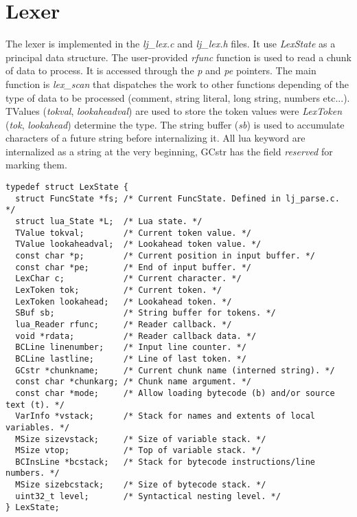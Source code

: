 
\section{Lexer}
\label{Sec:Lexer}

The lexer is implemented in the \emph{lj\_lex.c} and \emph{lj\_lex.h} files.
It use \emph{LexState} as a principal data structure. The user-provided
\emph{rfunc} function is used to read a chunk of data to process. It is accessed
through the \emph{p} and \emph{pe} pointers. The main function is
\emph{lex\_scan} that dispatches the work to other functions depending of the
type of data to be processed (comment, string literal, long string, numbers
etc...). TValues (\emph{tokval}, \emph{lookaheadval}) are used to store the
token values were \emph{LexToken} (\emph{tok}, \emph{lookahead}) determine the
type. The string buffer (\emph{sb}) is used to accumulate characters of a future
string before internalizing it. All lua keyword are internalized as a string at
the very beginning, GCstr has the field \emph{reserved} for marking them.

\begin{lstlisting}[style=CStyle]
typedef struct LexState {
  struct FuncState *fs; /* Current FuncState. Defined in lj_parse.c. */
  struct lua_State *L;  /* Lua state. */
  TValue tokval;        /* Current token value. */
  TValue lookaheadval;  /* Lookahead token value. */
  const char *p;        /* Current position in input buffer. */
  const char *pe;       /* End of input buffer. */
  LexChar c;            /* Current character. */
  LexToken tok;         /* Current token. */
  LexToken lookahead;   /* Lookahead token. */
  SBuf sb;              /* String buffer for tokens. */
  lua_Reader rfunc;     /* Reader callback. */
  void *rdata;          /* Reader callback data. */
  BCLine linenumber;    /* Input line counter. */
  BCLine lastline;      /* Line of last token. */
  GCstr *chunkname;     /* Current chunk name (interned string). */
  const char *chunkarg; /* Chunk name argument. */
  const char *mode;     /* Allow loading bytecode (b) and/or source text (t). */
  VarInfo *vstack;      /* Stack for names and extents of local variables. */
  MSize sizevstack;     /* Size of variable stack. */
  MSize vtop;           /* Top of variable stack. */
  BCInsLine *bcstack;   /* Stack for bytecode instructions/line numbers. */
  MSize sizebcstack;    /* Size of bytecode stack. */
  uint32_t level;       /* Syntactical nesting level. */
} LexState;
\end{lstlisting}

